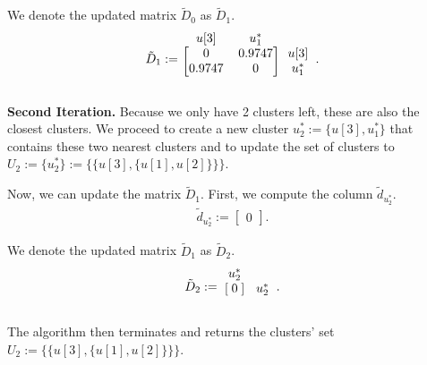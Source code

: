 \begin{example}
            We denote the updated matrix $\tilde{D}_0$ as $\tilde{D}_1$.
            \begin{align*}
                \tilde{D}_1 := \begin{blockarray}{ccc}
                                    u[3] & u_1^* \\
                                        \begin{block}{[cc]c}
                                          0 & 0.9747 & u[3] \\
                                          0.9747  & 0 & u_1^* \\
                                        \end{block}
                                \end{blockarray}.
            \end{align*}
            
            \textbf{Second Iteration.} Because we only have 2 clusters left, these are also the closest clusters. We proceed to create a new cluster $u_2^* := \{ u[3], u_1^* \}$ that contains these two nearest clusters and to update the set of clusters to $U_2 := \{ u_2^* \} := \{ \{ u[3], \{ u[1], u[2] \} \} \}$.
            
            Now, we can update the matrix $\tilde{D}_1$. First, we compute the column $\tilde{d}_{u_2^*}$.
            \begin{align*}
                \tilde{d}_{u_2^*} := \begin{bmatrix}
                    0
                \end{bmatrix}.
            \end{align*}
            
            We denote the updated matrix $\tilde{D}_1$ as $\tilde{D}_2$.
            \begin{align*}
                \tilde{D}_2 := \begin{blockarray}{cc}
                                    u_2^* \\
                                        \begin{block}{[c]c}
                                          0 & u_2^* \\
                                        \end{block}
                                \end{blockarray}.
            \end{align*}
            
            The algorithm then terminates and returns the clusters' set $U_2 := \{ \{ u[3], \{ u[1], u[2] \} \} \}$.
        \end{example}
        
